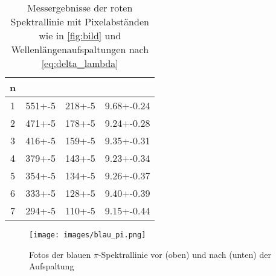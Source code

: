 \begin{table}[h]
    \centering
    \caption{Messergebnisse der roten Spektrallinie mit Pixelabständen wie in \autoref{fig:bild} und Wellenlängenaufspaltungen nach \autoref{eq:delta_lambda}}
    \label{tab:rot}
    \begin{tabular}{S[table-format=1.0] S[table-format=3.0(1)] S[table-format=3.0(1)] S[table-format=1.2(3)]}
        \toprule
        n &  & & \tableSI{\delta \lambda}{\pico\meter}  \\
         & 551+-5 & 218+-5 & 9.68+-0.24 \\
        2 & 471+-5 & 178+-5 & 9.24+-0.28 \\
        3 & 416+-5 & 159+-5 & 9.35+-0.31 \\
        4 & 379+-5 & 143+-5 & 9.23+-0.34 \\
        5 & 354+-5 & 134+-5 & 9.26+-0.37 \\
        6 & 333+-5 & 128+-5 & 9.40+-0.39 \\
        7 & 294+-5 & 110+-5 & 9.15+-0.44 \\
        \bottomrule
    \end{tabular}
\end{table}

\begin{figure}[ht]
    \centering
    \texttt{[image: images/blau\_pi.png]}
    \caption{Fotos der blauen $\pi$-Spektrallinie vor (oben) und nach (unten) der Aufspaltung}
    \label{fig:blau_pi}
\end{figure}

